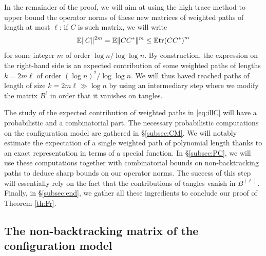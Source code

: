 \documentclass[11pt]{article}
\newcommand{\tr}{{\rm tr}}
\newcommand{\dE}{\mathbb {E}}
\newcommand{\PAR}[1]{{{\left(#1\right)}}} %
\newcommand{\1}{1\!\!{\sf I}}\newcommand{\IND}{\1}
\begin{document}
In the remainder of the proof, we will aim at using the  high trace method to upper bound the operator norms of these new matrices of weighted paths of length at most $\ell$: if $C$ is such matrix, we will write
\begin{equation}\label{eq:illC}
\dE \| C \|^{2m}  = \dE \| C C^* \|^m  \leq \dE \tr \PAR{ C C^* }^m   
\end{equation}
for some integer $m$ of order $\log n / \log \log n$. By construction, the expression on the right-hand side is an expected contribution of some weighted paths of lengths $k = 2 m \ell$ of order $(\log n )^2 / \log \log n$.  We will thus haved reached paths of length of size $k = 2 m \ell \gg \log n$ by using an intermediary step where we modify the matrix $B^\ell$ in order that it vanishes on tangles. 


The study of the expected contribution of weighted paths in \eqref{eq:illC} will have a probabilistic and a combinatorial part.  The necessary probabilistic computations on the configuration model are gathered in \S \ref{subsec:CM}. We will notably estimate the expectation of a single weighted path of polynomial length thanks to an exact representation in terms of a special function.  In  \S \ref{subsec:PC}, we will use these computations together with combinatorial bounds on non-backtracking paths to deduce sharp bounds on our operator norms. The success of this step will essentially rely on the fact that the contributions of tangles vanish in $B^{(\ell)}$. Finally, in \S  \ref{subsec:end}, we gather all these ingredients to conclude our proof of Theorem \ref{th:Fr}.

\subsection{The non-backtracking matrix of the configuration model}
\label{subsec:NB}
\end{document}
